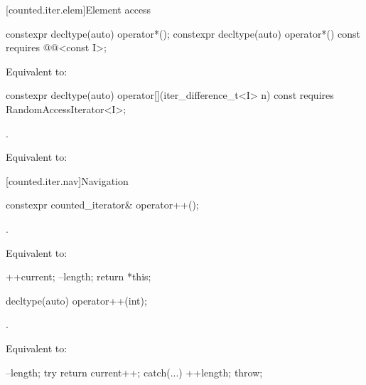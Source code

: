 \documentclass{wg21}
\begin{document}
[counted.iter.elem]{Element access}

%
\begin{itemdecl}
	constexpr decltype(auto) operator*();
	constexpr decltype(auto) operator*() const
	requires @@<const I>;
\end{itemdecl}

\begin{itemdescr}
	\pnum
	\effects Equivalent to: 
\end{itemdescr}

%
\begin{itemdecl}
	constexpr decltype(auto) operator[](iter_difference_t<I> n) const
	requires RandomAccessIterator<I>;
\end{itemdecl}

\begin{itemdescr}
	\pnum
	\expects {}.
	
	\pnum
	\effects Equivalent to: 
\end{itemdescr}

[counted.iter.nav]{Navigation}

%
\begin{itemdecl}
	constexpr counted_iterator& operator++();
\end{itemdecl}

\begin{itemdescr}
	\pnum
	\expects {}.
	
	\pnum
	\effects Equivalent to:
	\begin{codeblock}
		++current;
		--length;
		return *this;
	\end{codeblock}
\end{itemdescr}

%
\begin{itemdecl}
	decltype(auto) operator++(int);
\end{itemdecl}

\begin{itemdescr}
	\pnum
	
	\expects {}.
	
	\pnum
	\effects Equivalent to:
	\begin{codeblock}
		--length;
		try { return current++; }
		catch(...) { ++length; throw; }
	\end{codeblock}
\end{itemdescr}
\end{document}
